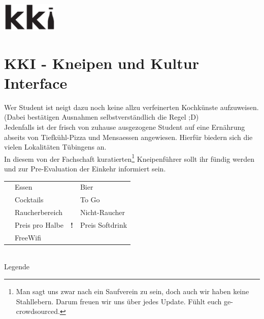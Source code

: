 \newcommand{\no}     {\faIcon{times}}
\newcommand{\yes}    {\faIcon{check}}
\newcommand{\unknown}{\faIcon{question}}

\newcommand{\is}[1]{\ifcsvstrcmp{#1}{}{n.a.}{#1}}

\newcommand{\has}[1]{\ifcsvstrcmp{#1}{0}{\no}{\ifcsvstrcmp{#1}{1}{\yes}{\unknown}}}

\newcommand{\features}[7]{
    \begin{tabular}{c|c|c|c|c|c|c}
        \renewcommand{\arraystretch}{2.5}
        \faIcon{utensils}       & \faIcon{beer}         & \faIcon{cocktail} & \faIcon{wifi}         & 
        \faIcon{shopping-bag}   & \faIcon{smoking}      & \faIcon{smoking-ban}              \\ \hline
        #1 & #2 & #3 & #4 & #5 & #6 & #7
    \end{tabular}
}

\newcommand{\kneipenCSV}{kki/dump.csv}

\centerline{\includegraphics[width=100px]{kki/kki-small.pdf}}

\section*{KKI - Kneipen und Kultur Interface}

Wer Student ist neigt dazu noch keine allzu verfeinerten Kochkünste aufzuweisen. (Dabei bestätigen Ausnahmen selbstverständlich die Regel ;D)\\
Jedenfalls ist der frisch von zuhause ausgezogene Student auf eine Ernährung abseits von Tiefkühl-Pizza und Mensaessen angewiesen. Hierfür biedern sich die vielen Lokalitäten Tübingens an.\\
In diesem von der Fachschaft kuratierten\footnote{Man sagt uns zwar nach ein Saufverein zu sein, doch auch wir haben keine Stahllebern. Darum freuen wir uns über jedes Update. Fühlt euch ge-crowdsourced.} Kneipenführer sollt ihr fündig werden und zur Pre-Evaluation der Einkehr informiert sein.

\begin{center}
	\noindent
	\begin{tabular}{cl|cl}
		\faUtensils     & Essen          & \faBeer           & Bier     \\
		\faCocktail     & Cocktails      & \faShoppingBag    & To Go      \\
		\faSmoking      & Raucherbereich & \faSmokingBan     & Nicht-Raucher \\
		\faBeer\faEuroSign               & Preis pro Halbe   & 
		\textbf{!}\faBeer\faEuroSign     & Preis Softdrink\\
		\faWifi           & FreeWifi     &&\\
	\end{tabular}\\
	Legende
\end{center}

